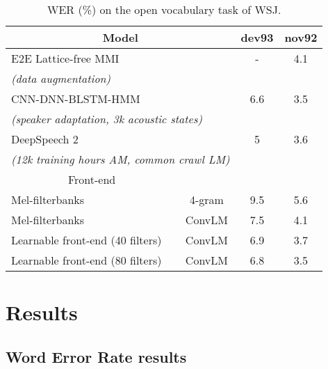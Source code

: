 \documentclass[a4paper]{article}
\begin{document}
\begingroup
\setlength{\tabcolsep}{3pt}
\begin{table}[]
    \centering
\begin{tabular}{lcccc} \toprule
\multicolumn{3}{c}{Model}&dev93&nov92\\
\midrule
\multicolumn{3}{l}{E2E Lattice-free MMI \cite{latticefreemmi}} & - & 4.1\\
\multicolumn{3}{l}{\small \emph{(data augmentation)}}& & \\
\multicolumn{3}{l}{CNN-DNN-BLSTM-HMM \cite{chan2015deep}}&6.6&3.5\\
\multicolumn{3}{l}{\small \emph{(speaker adaptation, 3k acoustic states)}}& &\\
\multicolumn{3}{l}{DeepSpeech 2 \cite{deepspeech2}}&5&3.6\\
\multicolumn{3}{l}{\small \emph{(12k training hours AM, common crawl LM)}}& &\\
\midrule
\multicolumn{2}{c}{Front-end}&{\centering{LM}}&&\\
\cmidrule{1-3}\multicolumn{2}{l}{Mel-filterbanks} & 4-gram & 9.5 & 5.6 \\
\multicolumn{2}{l}{Mel-filterbanks} & ConvLM &7.5 &4.1\\
\multicolumn{2}{l}{Learnable front-end (40 filters)} & ConvLM &6.9 &3.7\\
\multicolumn{2}{l}{Learnable front-end (80 filters)} & ConvLM &6.8&3.5\\
\bottomrule
\end{tabular}
   \caption{WER (\%) on the open vocabulary task of WSJ.}
    \label{tab:wsj}
\vspace{-4mm}
\end{table}
\endgroup


\section{Results}
\label{sec:results}

\subsection{Word Error Rate results}
\end{document}
